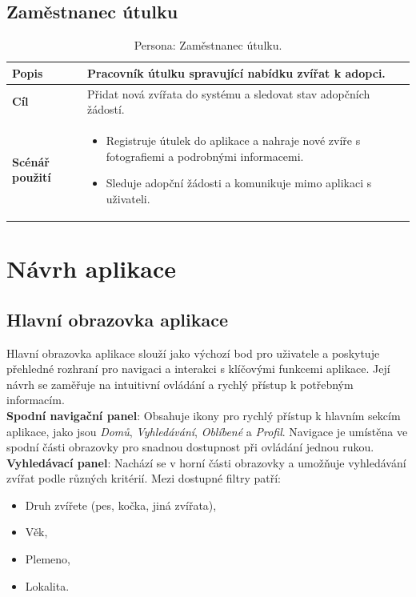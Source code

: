 \documentclass[12pt,a4paper]{report}
\begin{document}
\subsection{Zaměstnanec útulku}
\begin{table}[h!]
    \centering
    \renewcommand{\arraystretch}{1.4}
    \begin{tabular}{|p{3cm}|p{10cm}|}
        \hline
        \textbf{Popis} & Pracovník útulku spravující nabídku zvířat k adopci. \\ \hline
        \textbf{Cíl} & Přidat nová zvířata do systému a sledovat stav adopčních žádostí. \\ \hline
        \textbf{Scénář použití} &
        \begin{itemize}
            \item Registruje útulek do aplikace a nahraje nové zvíře s fotografiemi a podrobnými informacemi.
            \item Sleduje adopční žádosti a komunikuje mimo aplikaci s uživateli.
        \end{itemize} \\ \hline
    \end{tabular}
    \caption{Persona: Zaměstnanec útulku.}
    \label{tab:persona_shelter_worker}
\end{table}


\section{Návrh aplikace}

\subsection{Hlavní obrazovka aplikace}

Hlavní obrazovka aplikace slouží jako výchozí bod pro uživatele a poskytuje přehledné rozhraní pro navigaci a interakci s klíčovými funkcemi aplikace. Její návrh se zaměřuje na intuitivní ovládání a rychlý přístup k potřebným informacím.\\

\noindent \textbf{Spodní navigační panel}: Obsahuje ikony pro rychlý přístup k hlavním sekcím aplikace, jako jsou \textit{Domů}, \textit{Vyhledávání}, \textit{Oblíbené} a \textit{Profil}. Navigace je umístěna ve spodní části obrazovky pro snadnou dostupnost při ovládání jednou rukou.\\

\noindent \textbf{Vyhledávací panel}: Nachází se v horní části obrazovky a umožňuje vyhledávání zvířat podle různých kritérií. Mezi dostupné filtry patří:
\begin{itemize}
    \item Druh zvířete (pes, kočka, jiná zvířata),
    \item Věk,
    \item Plemeno,
    \item Lokalita.
\end{itemize}
\end{document}

